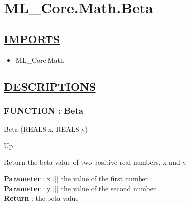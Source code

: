 \chapter*{ML\_Core.Math.Beta}
\hypertarget{ecldoc:toc:ML_Core.Math.Beta}{}

\section*{\underline{IMPORTS}}
\begin{itemize}
\item ML\_Core.Math
\end{itemize}

\section*{\underline{DESCRIPTIONS}}
\subsection*{FUNCTION : Beta}
\hypertarget{ecldoc:ml_core.math.beta}{}
\begin{minipage}[t]{\textwidth}
\begin{flushleft}
 Beta (REAL8 x, REAL8 y)
\end{flushleft}
\end{minipage}
\hyperlink{ecldoc:toc:ML_Core/Math}{Up}

\par
Return the beta value of two positive real numbers, x and y
\par
\textbf{Parameter} : x ||| the value of the first number \\
\textbf{Parameter} : y ||| the value of the second number \\
\textbf{Return} : the beta value \\
